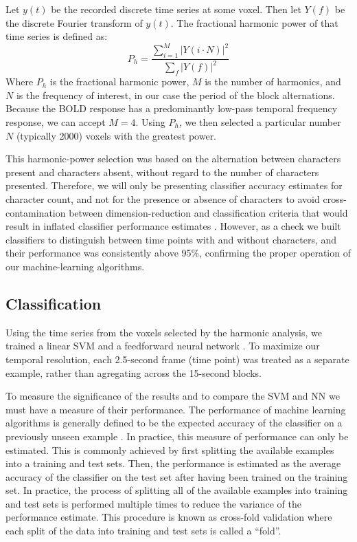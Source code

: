 \documentclass[preprint,5p,authoryear]{elsarticle}
\begin{document}
Let $y(t)$ be the recorded discrete time series at some voxel.
Then let $Y(f)$ be the discrete Fourier transform of $y(t)$.
The fractional harmonic power of that time series is defined as:
\begin{equation}
P_h = \frac{\sum_{i = 1}^{M}{\left|Y(i \cdot N)\right|^{2}}}{\sum_{f}{\left|Y(f)\right|^{2}}}
\end{equation}
Where $P_h$ is the fractional harmonic power, $M$ is the number of harmonics, and $N$ is the frequency of interest, in our case the period of the block alternations. 
Because the BOLD response has a predominantly low-pass temporal frequency response, we can accept $M = 4$. 
Using $P_h$, we then selected a particular number $N$ (typically 2000) voxels with the greatest power. 

This harmonic-power selection was based on the alternation between characters present and characters absent, without regard to the number of characters presented. 
Therefore, we will only be presenting classifier accuracy estimates for character count, and not for the presence or absence of characters to avoid cross-contamination between dimension-reduction and  classification criteria that would result in inflated classifier performance estimates \citep{Pereira2009}.
However, as a check we built classifiers to distinguish between time points with and without characters, and their performance was consistently above 95\%, confirming the proper operation of our machine-learning algorithms.

\subsection{Classification}
Using the time series from the voxels selected by the harmonic analysis, we trained a linear SVM \citep{Cortes1995} and a feedforward neural network \citep{Hornik1989,Hagan1994}.
To maximize our temporal resolution, each 2.5-second frame (time point) was treated as a separate example, rather than agregating across the 15-second blocks.

To measure the significance of the results and to compare the SVM and NN we must have a measure of their performance.
The performance of machine learning algorithms is generally defined to be the expected accuracy of the classifier on a previously unseen example \citep{MLBook}.
In practice, this measure of performance can only be estimated.
This is commonly achieved by first splitting the available examples into a training and test sets.
Then, the performance is estimated as the average accuracy of the classifier on the test set after having been trained on the training set.
In practice, the process of splitting all of the available examples into training and test sets is performed multiple times to reduce the variance of the performance estimate.
This procedure is known as cross-fold validation \citep{Kohavi1995} where each split of the data into training and test sets is called a ``fold''.
\end{document}
